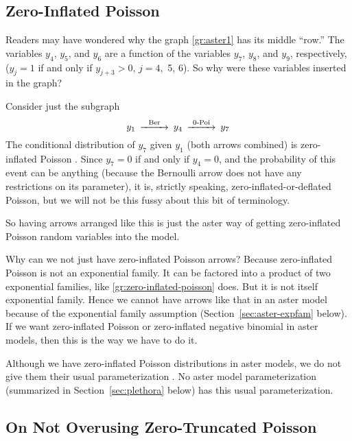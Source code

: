 \subsection{Zero-Inflated Poisson}
\label{sec:zero-inflated}

Readers may have wondered why the graph \eqref{gr:aster1}
has its middle ``row.''  The variables $y_4$, $y_5$, and $y_6$ are a function
of the variables $y_7$, $y_8$, and $y_9$, respectively,
($y_j = 1$ if and only if $y_{j + 3} > 0$, $j = 4,$ 5, 6).
So why were these variables inserted in the graph?

Consider just the subgraph
\begin{equation} \label{gr:zero-inflated-poisson}
\begin{CD}
   y_1 @>\text{Ber}>> y_4 @>\text{0-Poi}>> y_7
\end{CD}
\end{equation}
The conditional distribution of $y_7$ given $y_1$ (both arrows combined)
is zero-inflated Poisson \citep{lambert}.
Since $y_7 = 0$ if and only if $y_4 = 0$, and the probability of this event
can be anything
(because the Bernoulli arrow does not have any restrictions on its parameter),
it is, strictly speaking, zero-inflated-or-deflated Poisson, but we will not
be this fussy about this bit of terminology.

So having arrows arranged like this is just the aster way of getting
zero-inflated Poisson random variables into the model.

Why can we not just have zero-inflated Poisson arrows?  Because
zero-inflated Poisson is not an exponential family.  It can be factored
into a product of two exponential families, like
\eqref{gr:zero-inflated-poisson} does.  But it is not itself exponential
family.  Hence we cannot have arrows like that in an aster model
because of the exponential family assumption (Section~\ref{sec:aster-expfam}
below).  If we want zero-inflated Poisson or zero-inflated negative binomial
in aster models, then this is the way we have to do it.

Although we have zero-inflated Poisson distributions in aster models,
we do not give them their usual parameterization \citep{lambert}.
No aster model parameterization (summarized in Section~\ref{sec:plethora}
below) has this usual parameterization.

\subsection{On Not Overusing Zero-Truncated Poisson}

